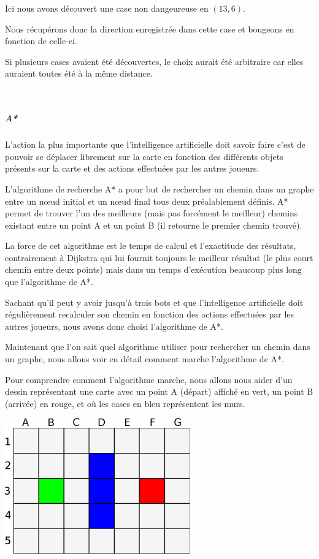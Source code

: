 			Ici nous avons découvert une case non dangeureuse en $(13,6)$.
			
			Nous récupérons donc la direction enregistrée dans cette case et bougeons en fonction de celle-ci.
			
			Si plusieurs cases avaient été découvertes, le choix aurait été arbitraire car elles auraient toutes été à la même distance.
			
			$\,$
			
		\subparagraph{A*\\}
		
			L'action la plus importante que l'intelligence artificielle doit savoir faire c'est de pouvoir se déplacer librement sur la carte en fonction des différents objets présents sur la carte et des actions effectuées par les autres joueurs.
		
			L'algorithme de recherche A* a pour but de rechercher un chemin
			dans un graphe entre un nœud initial et un nœud final tous deux préalablement
			définis. A* permet de trouver l'un des meilleurs (mais pas forcément le
			meilleur) chemins existant entre un point A et un point B (il retourne le premier chemin trouvé).
			
			La force de cet algorithme est le temps de calcul et l'exactitude des résultats, contrairement à Dijkstra qui lui fournit toujours le meilleur résultat (le plus court chemin entre deux points) mais dans un temps d'exécution beaucoup plus long que l'algorithme de A*.
			
			Sachant qu'il peut y avoir jusqu'à trois \glspl{bot} et que l'intelligence artificielle doit régulièrement recalculer son chemin en fonction des actions effectuées par les autres joueurs, nous avons donc choisi l'algorithme de A*.
		
			Maintenant que l'on sait quel algorithme utiliser pour rechercher un chemin dans un graphe, nous allons voir en détail comment marche l'algorithme de A*.
		
			Pour comprendre comment l'algorithme marche, nous allons nous aider d'un
			dessin représentant une carte avec un point A (départ) affiché en vert, un
			point B (arrivée) en rouge, et où les cases en bleu représentent les murs.
		
			\begin{center}
				\includegraphics[width=8cm]{./Analyse/Img/Grille.eps}
			\end{center}
		
